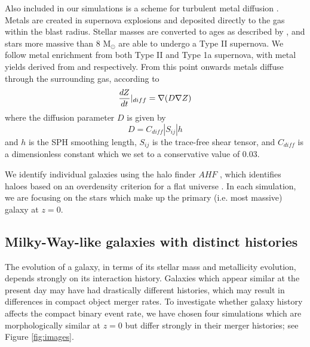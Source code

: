 \documentclass[a4paper,fleqn,usenatbib]{mnras}
\begin{document}
Also included in our simulations is a scheme for turbulent metal
diffusion \citep{Shen10}.  Metals are created in supernova explosions
and deposited directly to the gas within the blast radius.  Stellar
masses are converted to ages as described by \citet{Raiteri96}, and
stars more massive than 8 M$_\odot$ are able to undergo a Type II
supernova.  We follow metal enrichment from both Type II and Type 1a
supernova, with metal yields derived from \citet{Weaver93} and
\citet{Thielemann86} respectively.  From this point onwards metals
diffuse through the surrounding gas, according to 
\begin{equation}
\frac{dZ}{dt}|_{diff} = \nabla (D \nabla {Z}) \\
\end{equation}
%
where the diffusion parameter $D$ is given by
%
\begin{equation}
D = C_{diff} |S_{ij}| h
\end{equation}
%
and $h$ is the SPH smoothing length, $S_{ij}$ is the trace-free shear
tensor, and $C_{diff}$ is a dimensionless constant which we set to a conservative value of 0.03.  


We identify individual galaxies using the halo finder $AHF$
\citep{Gill04,Knollmann09}, which identifies haloes based on an
overdensity criterion for a flat universe \citep{Gross97}.  In each simulation, we are focusing on the stars which make up the primary (i.e. most massive) galaxy at $z = 0$.%



\subsection{Milky-Way-like galaxies with distinct histories }

The evolution
of a galaxy, in terms of its stellar mass and metallicity evolution,
depends strongly on its interaction history.  Galaxies which appear
similar at the present day may have had drastically different
histories, which may result in differences in compact object merger
rates.  To investigate whether galaxy history affects the compact binary event
rate, we have chosen four simulations which are morphologically similar at $z
= 0$ but differ strongly in their merger histories; see Figure \ref{fig:images}.
\end{document}
